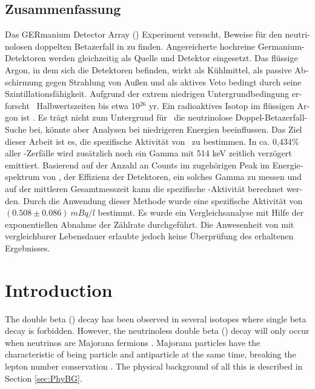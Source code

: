 \documentclass[encoding=utf8,british]{tumphthesis}
\begin{document}
\begin{otherlanguage}{ngerman}
\chapter*{Zusammenfassung}
Das GERmanium Detector Array (\gerda) Experiment versucht, Beweise für den neutrinolosen doppelten Betazerfall in  zu finden.
Angereicherte hochreine Germanium-Detektoren werden gleichzeitig als Quelle und Detektor eingesetzt.
Das flüssige Argon, in dem sich die Detektoren befinden, wirkt als Kühlmittel, als passive Abschirmung gegen Strahlung von Außen und als aktives Veto bedingt durch seine Szintillationsfähigkeit.
Aufgrund der extrem niedrigen Untergrundbedingung erforscht \gerda\ Halbwertszeiten bis etwa 10$^{26}$ yr.
Ein radioaktives Isotop im flüssigen Argon ist .
Es trägt nicht zum Untergrund für \gerdas\ die neutrinolose Doppel-Betazerfall-Suche bei, könnte aber Analysen bei niedrigeren Energien beeinflussen.
Das Ziel dieser Arbeit ist es, die spezifische Aktivität von \Kr\ zu bestimmen.
In ca. 0,434$\%$ aller \Kr-Zerfälle wird zusätzlich noch ein Gamma mit 514 keV zeitlich verzögert  emittiert.
Basierend auf der Anzahl an Counts im zugehörigen Peak im Energiespektrum von \gerda, der Effizienz der Detektoren, ein solches Gamma zu messen und auf der mittleren Gesamtmesszeit kann die spezifische \Kr-Aktivität berechnet werden.
Durch die Anwendung dieser Methode wurde eine spezifische Aktivität von $(0.508\pm0.086) \   \unit{mBq}/ \unit{l}$ bestimmt.
Es wurde ein Vergleichsanalyse mit Hilfe der exponentiellen Abnahme der Zählrate durchgeführt.
Die Anwesenheit von  mit vergleichbarer Lebensdauer erlaubte jedoch keine Überprüfung des erhaltenen Ergebnisses.

\end{otherlanguage}

\tableofcontents

\mainmatter

\chapter{Introduction}
\label{sec:intro}

The double beta (\twonu) decay has been observed in several isotopes where single beta decay is forbidden.
However, the neutrinoless double beta (\onbb) decay will only occur when neutrinos are Majorana fermions \cite{schechter_neutrinoless_1982}.
Majorana particles have the characteristic of being particle and antiparticle at the same time, breaking the lepton number conservation  \cite{bilenky_massive_1987}.
The physical background of all this is described in Section \ref{sec:PhyBG}.
\\
\end{document}
